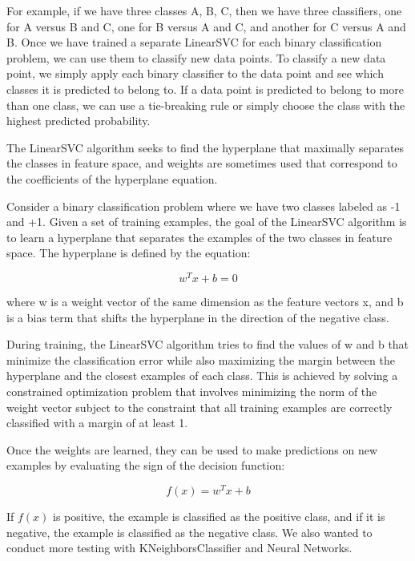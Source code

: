 For example, if we have three classes A, B, C, then we have three classifiers, one for A versus B and C, one for B versus A and C, and another for C versus A and B. Once we have trained a separate LinearSVC for each binary classification problem, we can use them to classify new data points. To classify a new data point, we simply apply each binary classifier to the data point and see which classes it is predicted to belong to. If a data point is predicted to belong to more than one class, we can use a tie-breaking rule or simply choose the class with the highest predicted probability.

The LinearSVC algorithm seeks to find the hyperplane that maximally separates the classes in feature space, and weights are sometimes used that correspond to the coefficients of the hyperplane equation.

Consider a binary classification problem where we have two classes labeled as -1 and +1. Given a set of training examples, the goal of the LinearSVC algorithm is to learn a hyperplane that separates the examples of the two classes in feature space. The hyperplane is defined by the equation:

\begin{equation}
w^T x + b = 0
\end{equation}

where w is a weight vector of the same dimension as the feature vectors x, and b is a bias term that shifts the hyperplane in the direction of the negative class.

During training, the LinearSVC algorithm tries to find the values of w and b that minimize the classification error while also maximizing the margin between the hyperplane and the closest examples of each class. This is achieved by solving a constrained optimization problem that involves minimizing the norm of the weight vector subject to the constraint that all training examples are correctly classified with a margin of at least 1.

Once the weights are learned, they can be used to make predictions on new examples by evaluating the sign of the decision function:

\begin{equation}
f(x) = w^T x + b
\end{equation}

If $f(x)$ is positive, the example is classified as the positive class, and if it is negative, the example is classified as the negative class. We also wanted to conduct more testing with KNeighborsClassifier and Neural Networks. 

